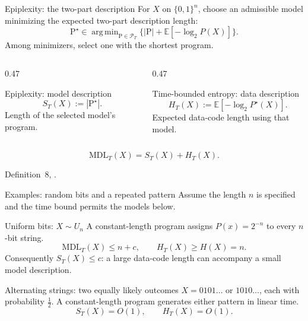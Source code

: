 \documentclass[aspectratio=169,notheorems]{beamer}
\theoremstyle{definition}
\newcommand{\E}{\mathbb{E}}
\newcommand{\MDL}{\mathrm{MDL}}
\newcommand{\PT}{\mathcal{P}_T}
\newcommand{\prog}{\mathrm{P}}
\DeclareMathOperator*{\argmin}{arg\,min}
\newcommand{\src}[1]{{\scriptsize\color{black!60}#1\par}}
\begin{document}
\begin{frame}{Epiplexity: the two-part description}
\small
For $X$ on $\{0,1\}^n$, choose an admissible model minimizing the expected two-part description length:
\[
\prog^\star\in\argmin_{\prog\in\PT}
\bigl\{|\prog|+\E[-\log_2 P(X)]\bigr\}.
\]
Among minimizers, select one with the shortest program.

\begin{columns}[T]
\begin{column}{0.47\textwidth}
\begin{block}{Epiplexity: model description}
\[
S_T(X):=|\prog^\star|.
\]
Length of the selected model's program.
\end{block}
\end{column}
\begin{column}{0.47\textwidth}
\begin{block}{Time-bounded entropy: data description}
\[
H_T(X):=\E[-\log_2 P^\star(X)].
\]
Expected data-code length using that model.
\end{block}
\end{column}
\end{columns}
\[
\MDL_T(X)=S_T(X)+H_T(X).
\]
\src{Definition~8, \citet{finzi2026}.}
\end{frame}
\begin{frame}{Examples: random bits and a repeated pattern}
\small
Assume the length $n$ is specified and the time bound permits the models below.

\begin{block}{Uniform bits: $X\sim U_n$}
A constant-length program assigns $P(x)=2^{-n}$ to every $n$-bit string.
\[
\MDL_T(X)\le n+c,\qquad H_T(X)\ge H(X)=n.
\]
Consequently $S_T(X)\le c$: a large data-code length can accompany a small model description.
\end{block}

\begin{block}{Alternating strings: two equally likely outcomes}
$X=0101\ldots$ or $1010\ldots$, each with probability $\tfrac12$.
A constant-length program generates either pattern in linear time.
\[
S_T(X)=O(1),\qquad H_T(X)=O(1).
\]
\end{block}
\end{frame}
\end{document}
